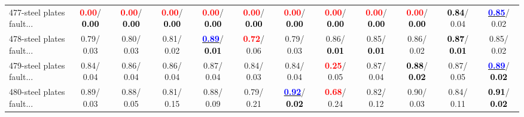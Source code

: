 \begin{table}[h]
\begin{center}
{\begin{tabular}{lc|c|c|c|c|c|c|c|c|c|c}
477-steel plates fault... & \textcolor{red}{\textbf{  0.00}}/\textcolor{black}{\textbf{  0.00}} & \textcolor{red}{\textbf{  0.00}}/\textcolor{black}{\textbf{  0.00}} & \textcolor{red}{\textbf{  0.00}}/\textcolor{black}{\textbf{  0.00}} & \textcolor{red}{\textbf{  0.00}}/\textcolor{black}{\textbf{  0.00}} & \textcolor{red}{\textbf{  0.00}}/\textcolor{black}{\textbf{  0.00}} & \textcolor{red}{\textbf{  0.00}}/\textcolor{black}{\textbf{  0.00}} & \textcolor{red}{\textbf{  0.00}}/\textcolor{black}{\textbf{  0.00}} & \textcolor{red}{\textbf{  0.00}}/\textcolor{black}{\textbf{  0.00}} & \textcolor{red}{\textbf{  0.00}}/\textcolor{black}{\textbf{  0.00}} & \textcolor{black}{\textbf{  0.84}}/  0.04 & \underline{\textcolor{blue}{\textbf{  0.85}}}/  0.02 \\
478-steel plates fault... &   0.79/  0.03 &   0.80/  0.03 &   0.81/  0.02 & \underline{\textcolor{blue}{\textbf{  0.89}}}/\textcolor{black}{\textbf{  0.01}} & \textcolor{red}{\textbf{  0.72}}/  0.06 &   0.79/  0.03 &   0.86/\textcolor{black}{\textbf{  0.01}} &   0.85/\textcolor{black}{\textbf{  0.01}} &   0.86/  0.02 & \textcolor{black}{\textbf{  0.87}}/\textcolor{black}{\textbf{  0.01}} &   0.85/  0.02 \\
479-steel plates fault... &   0.84/  0.04 &   0.86/  0.04 &   0.86/  0.04 &   0.87/  0.04 &   0.84/  0.03 &   0.84/  0.04 & \textcolor{red}{\textbf{  0.25}}/  0.05 &   0.87/  0.04 & \textcolor{black}{\textbf{  0.88}}/\textcolor{black}{\textbf{  0.02}} &   0.87/  0.05 & \underline{\textcolor{blue}{\textbf{  0.89}}}/\textcolor{black}{\textbf{  0.02}} \\
480-steel plates fault... &   0.89/  0.03 &   0.88/  0.05 &   0.81/  0.15 &   0.88/  0.09 &   0.79/  0.21 & \underline{\textcolor{blue}{\textbf{  0.92}}}/\textcolor{black}{\textbf{  0.02}} & \textcolor{red}{\textbf{  0.68}}/  0.24 &   0.82/  0.12 &   0.90/  0.03 &   0.84/  0.11 & \textcolor{black}{\textbf{  0.91}}/\textcolor{black}{\textbf{  0.02}} \\\end{tabular}}\label{stratsALCKappa14AllReduxa}
\end{center}
\end{table}

